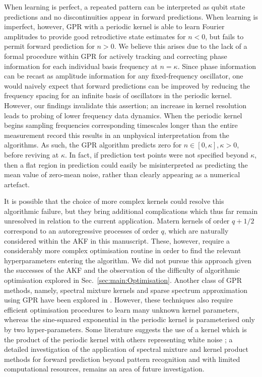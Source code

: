 When learning is perfect, a repeated pattern can be interpreted as qubit state predictions and no discontinuities appear in forward predictions. When learning is imperfect, however, GPR with a periodic kernel is able to learn Fourier amplitudes to provide good retrodictive state estimates for $n<0$, but fails to permit forward prediction for $n>0$.  We believe this arises due to the lack of a formal procedure within GPR for actively  tracking and correcting phase information for each individual basis frequency at $n= \kappa$.  Since phase information can be recast as amplitude information for any fixed-frequency oscillator, one would naively expect that forward predictions can be improved by reducing the frequency spacing for an infinite basis of oscillators in the periodic kernel.  However, our findings invalidate this assertion; an increase in kernel resolution leads to probing of lower frequency data dynamics.  When the periodic kernel begins sampling frequencies corresponding timescales longer than the entire measurement record this results in an unphysical interpretation from the algorithms.  As such, the GPR algorithm predicts zero for $n \in [0, \kappa], \kappa > 0$, before reviving at $\kappa$.  In fact, if prediction test points were not specified beyond $\kappa$, then a flat region in prediction could easily be misinterpreted as predicting the mean value of zero-mean noise, rather than clearly appearing as a numerical artefact. 

It is possible that the choice of more complex kernels could resolve this algorithmic failure, but they bring additional complications which thus far remain unresolved in relation to the current application.  Matern kernels of order $q + 1/2$ correspond to an autoregressive processes of order $q$, which are naturally considered within the AKF in this manuscript. These, however, require a considerably more complex optimisation routine in order to find the relevant hyperparameters entering the algorithm.  We did not pursue this approach given the successes of the AKF and the observation of the difficulty of algorithmic optimisation explored in Sec.~\ref{sec:main:Optimisation}.  Another class of GPR methods, namely, spectral mixture kernels and sparse spectrum approximation using GPR have been explored in \cite{wilson2013, quia2010}. However, these techniques also require efficient optimisation procedures to learn many unknown kernel parameters, whereas the sine-squared exponential in the periodic kernel is parameterised only by two hyper-parameters.  Some literature suggests the use of a kernel which is the product of the periodic kernel with others representing white noise \cite{klenske2016gaussian}; a detailed investigation of the application of spectral mixture and kernel product methods for forward prediction beyond pattern recognition and with limited computational resources, remains an area of future investigation.



